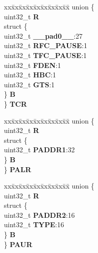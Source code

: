 \begin{DoxyCompactItemize}
\begin{tabbing}
\end{tabbing}\item 
\mbox{\label{structFEC__tag_aa69cc1168972ac8643f56c833c91507b}} 
\begin{tabbing}
xx\=xx\=xx\=xx\=xx\=xx\=xx\=xx\=xx\=\kill
union \{\\
\>uint32\_t {\bfseries R}\\
\>struct \{\\
\>\>uint32\_t {\bfseries \_\_pad0\_\_}:27\\
\>\>uint32\_t {\bfseries RFC\_PAUSE}:1\\
\>\>uint32\_t {\bfseries TFC\_PAUSE}:1\\
\>\>uint32\_t {\bfseries FDEN}:1\\
\>\>uint32\_t {\bfseries HBC}:1\\
\>\>uint32\_t {\bfseries GTS}:1\\
\>\} {\bfseries B}\\
\} {\bfseries TCR}\\

\end{tabbing}\item 
\mbox{\label{structFEC__tag_ac411a06df99008a70e7b16927950580e}} 
\begin{tabbing}
xx\=xx\=xx\=xx\=xx\=xx\=xx\=xx\=xx\=\kill
union \{\\
\>uint32\_t {\bfseries R}\\
\>struct \{\\
\>\>uint32\_t {\bfseries PADDR1}:32\\
\>\} {\bfseries B}\\
\} {\bfseries PALR}\\

\end{tabbing}\item 
\mbox{\label{structFEC__tag_a0375824f515fa1a90ca8367e601f142c}} 
\begin{tabbing}
xx\=xx\=xx\=xx\=xx\=xx\=xx\=xx\=xx\=\kill
union \{\\
\>uint32\_t {\bfseries R}\\
\>struct \{\\
\>\>uint32\_t {\bfseries PADDR2}:16\\
\>\>uint32\_t {\bfseries TYPE}:16\\
\>\} {\bfseries B}\\
\} {\bfseries PAUR}\\


\end{tabbing}
\end{DoxyCompactItemize}
